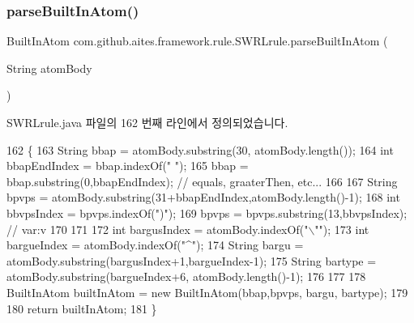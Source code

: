 \subsubsection{\texorpdfstring{parse\+Built\+In\+Atom()}{parseBuiltInAtom()}}
{\footnotesize\ttfamily Built\+In\+Atom com.\+github.\+aites.\+framework.\+rule.\+S\+W\+R\+Lrule.\+parse\+Built\+In\+Atom (\begin{DoxyParamCaption}\item[{String}]{atom\+Body }\end{DoxyParamCaption})\hspace{0.3cm}{\ttfamily [private]}}



S\+W\+R\+Lrule.\+java 파일의 162 번째 라인에서 정의되었습니다.


\begin{DoxyCode}
162                                                          \{
163         String bbap = atomBody.substring(30, atomBody.length());
164         \textcolor{keywordtype}{int} bbapEndIndex = bbap.indexOf(\textcolor{stringliteral}{" "});
165         bbap = bbap.substring(0,bbapEndIndex); \textcolor{comment}{// equals, graaterThen, etc... }
166         
167         String bpvps = atomBody.substring(31+bbapEndIndex,atomBody.length()-1);
168         \textcolor{keywordtype}{int} bbvpsIndex = bpvps.indexOf(\textcolor{stringliteral}{")"});
169         bpvps = bpvps.substring(13,bbvpsIndex); \textcolor{comment}{// var:v}
170         
171         
172         \textcolor{keywordtype}{int} bargusIndex = atomBody.indexOf(\textcolor{stringliteral}{"\(\backslash\)""});
173         \textcolor{keywordtype}{int} bargueIndex = atomBody.indexOf(\textcolor{stringliteral}{"^"});
174         String bargu = atomBody.substring(bargusIndex+1,bargueIndex-1);
175         String bartype = atomBody.substring(bargueIndex+6, atomBody.length()-1);
176             
177         
178         BuiltInAtom builtInAtom = \textcolor{keyword}{new} BuiltInAtom(bbap,bpvps, bargu, bartype);
179         
180         \textcolor{keywordflow}{return} builtInAtom;
181     \}
\end{DoxyCode}
\mbox{\label{classcom_1_1github_1_1aites_1_1framework_1_1rule_1_1_s_w_r_lrule_ab01ac639c58b1478dc20272002106798}} 
